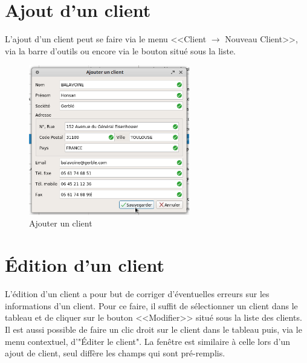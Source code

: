 \section{Ajout d'un client}
L'ajout d’un client peut se faire via le menu <<Client $\rightarrow$ Nouveau Client>>, via la barre d'outils ou encore via le bouton situé sous la
liste. 
\begin{figure}[H]
	\centering
	\includegraphics[width=7cm]{screens/ajouterClient.png}
	\caption{Ajouter un client}
\end{figure}

\section{Édition d'un client}
L’édition d’un client a pour but de corriger d’éventuelles erreurs sur les informations d’un client. Pour ce faire, il suffit de sélectionner
un client dans le tableau et de cliquer sur le bouton <<Modifier>> situé sous la liste des clients. Il est aussi possible de faire un clic droit sur le client dans le tableau puis, via le menu contextuel, d'"Éditer le client".
 La fenêtre est similaire à celle lors d’un ajout de client, seul diffère les champs qui sont pré-remplis. 

